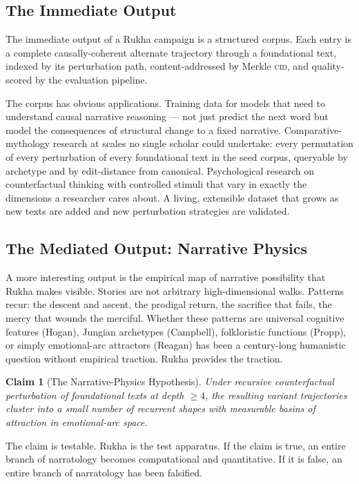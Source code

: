 \documentclass[11pt]{article}
\theoremstyle{rukha}
\newtheorem{claim}{Claim}
\begin{document}
\subsection{The Immediate Output}

The immediate output of a Rukha campaign is a structured corpus.
Each entry is a complete causally-coherent alternate trajectory
through a foundational text, indexed by its perturbation path,
content-addressed by Merkle \textsc{cid}, and quality-scored by the
evaluation pipeline.

The corpus has obvious applications. Training data for models that need
to understand causal narrative reasoning --- not just predict the next
word but model the consequences of structural change to a fixed
narrative. Comparative-mythology research at scales no single scholar
could undertake: every permutation of every perturbation of every
foundational text in the seed corpus, queryable by archetype and by
edit-distance from canonical. Psychological research on counterfactual
thinking with controlled stimuli that vary in exactly the dimensions a
researcher cares about. A living, extensible dataset that grows as new
texts are added and new perturbation strategies are validated.

\subsection{The Mediated Output: Narrative Physics}

A more interesting output is the empirical map of narrative possibility
that Rukha makes visible. Stories are not arbitrary high-dimensional
walks. Patterns recur: the descent and ascent, the prodigal return, the
sacrifice that fails, the mercy that wounds the merciful. Whether these
patterns are universal cognitive features (Hogan), Jungian archetypes
(Campbell), folkloristic functions (Propp), or simply emotional-arc
attractors (Reagan) has been a century-long humanistic question
without empirical traction. Rukha provides the traction.

\begin{claim}[The Narrative-Physics Hypothesis]
Under recursive counterfactual perturbation of foundational texts at
depth $\geq 4$, the resulting variant trajectories cluster into a small
number of recurrent shapes with measurable basins of attraction in
emotional-arc space.
\end{claim}

The claim is testable. Rukha is the test apparatus. If the claim is
true, an entire branch of narratology becomes computational and
quantitative. If it is false, an entire branch of narratology has been
falsified.
\end{document}
